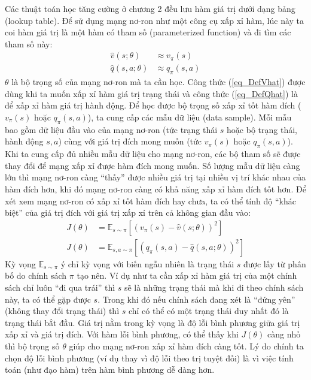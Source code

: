 	Các thuật toán học tăng cường ở chương 2 đều lưu hàm giá trị dưới dạng bảng (lookup table).
	Để sử dụng mạng nơ-ron như một công cụ xấp xỉ hàm, lúc này ta coi hàm giá trị là một hàm có tham số (parameterized function) và đi tìm các tham số này:
	\begin{align}
		\hat{v}(s;\theta) &\approx v_{\pi}(s) \label{eq_DefVhat}\\
		\hat{q}(s,a;\theta) &\approx q_{\pi}(s,a) \label{eq_DefQhat}
	\end{align}
	$\theta$ là bộ trọng số của mạng nơ-ron mà ta cần học.
	Công thức (\ref{eq_DefVhat}) được dùng khi ta muốn xấp xỉ hàm giá trị trạng thái và công thức (\ref{eq_DefQhat}) là để xấp xỉ hàm giá trị hành động.
	Để học được bộ trọng số xấp xỉ tốt hàm đích ($v_{\pi}(s)$ hoặc $q_{\pi}(s,a)$), ta cung cấp các mẫu dữ liệu (data sample).
	Mỗi mẫu bao gồm dữ liệu đầu vào của mạng nơ-ron (tức trạng thái $s$ hoặc bộ trạng thái, hành động $s, a$) cùng với giá trị đích mong muốn (tức $v_{\pi}(s)$ hoặc $q_{\pi}(s,a)$).
	Khi ta cung cấp đủ nhiều mẫu dữ liệu cho mạng nơ-ron, các bộ tham số sẽ được thay đổi để mạng xấp xỉ được hàm đích mong muốn.
	Số lượng mẫu dữ liệu càng lớn thì mạng nơ-ron càng ``thấy'' được nhiều giá trị tại nhiều vị trí khác nhau của hàm đích hơn, khi đó mạng nơ-ron càng có khả năng xấp xỉ hàm đích tốt hơn.	
	Để xét xem mạng nơ-ron có xấp xỉ tốt hàm đích hay chưa, ta có thể tính độ ``khác biệt'' của giá trị đích với giá trị xấp xỉ trên cả không gian đầu vào:
	\begin{align}
		\label{eq_ExpectedErrorV}
		J(\theta) &= \mathbb{E}_{s \sim \pi}[(v_{\pi}(s) - \hat{v}(s;\theta))^2]\\
		\label{eq_ExpectedErrorQ}
		J(\theta) &= \mathbb{E}_{s,a \sim \pi}[(q_{\pi}(s,a) - \hat{q}(s,a;\theta))^2]
	\end{align}
	Kỳ vọng $\mathbb{E}_{s \sim \pi}$ ý chỉ kỳ vọng với biến ngẫu nhiên là trạng thái $s$ được lấy từ phân bố do chính sách $\pi$ tạo nên.
	Ví dụ như ta cần xấp xỉ hàm giá trị của một chính sách chỉ luôn ``đi qua trái'' thì $s$ sẽ là những trạng thái mà khi đi theo chính sách này, ta có thể gặp được $s$.
	Trong khi đó nếu chính sách đang xét là ``đứng yên'' (không thay đổi trạng thái) thì $s$ chỉ có thể có một trạng thái duy nhất đó là trạng thái bắt đầu.
	Giá trị nằm trong kỳ vọng là độ lỗi bình phương giữa giá trị xấp xỉ và giá trị đích.
	Với hàm lỗi bình phương, có thể thấy khi $J(\theta)$ càng nhỏ thì bộ trọng số $\theta$ giúp cho mạng nơ-ron xấp xỉ hàm đích càng tốt.
	Lý do chính ta chọn độ lỗi bình phương (ví dụ thay vì độ lỗi theo trị tuyệt đối) là vì việc tính toán (như đạo hàm) trên hàm bình phương dễ dàng hơn.
	
